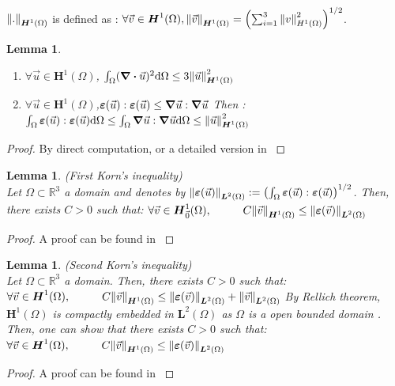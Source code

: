 \documentclass[a4paper,12pt,twoside]{report}
\newcommand{\mtr}{\mathbb{R}}
\newcommand{\dif}{\mathrm{d}}
\newtheorem{lemma}[theorem]{Lemma}
\begin{document}
$\norm{.}_{\boldsymbol H^1(\Omega)}$ is defined as : $\forall \vec v \in \boldsymbol H^1(\Omega), \norm{\vec v}_{\boldsymbol H^1(\Omega)} = \left(\sum_{i=1}^3 \norm{v}_{H^1(\Omega)}^2 \right)^{1/2}$. 
\begin{lemma}
\begin{enumerate}
    \item $\displaystyle \forall \vec u \in \boldsymbol H^1(\Omega)$, $\int_\Omega (\div \vec u)^2 \dif \Omega \leq 3 \norm{\vec u}_{\boldsymbol H^1(\Omega)}^2$
    \item $\displaystyle \forall \vec u \in \boldsymbol H^1(\Omega)$,$\boldsymbol \varepsilon(\vec u) : \boldsymbol \varepsilon(\vec u) \leq \grad \vec u : \grad \vec u$
    Then : $\int_\Omega \boldsymbol \varepsilon(\vec u) : \boldsymbol \varepsilon(\vec u) \dif\Omega \leq \int_\Omega \grad \vec u : \grad \vec u \dif \Omega \leq \norm{\vec u}_{\boldsymbol H^1(\Omega)}^2$
\end{enumerate}
\end{lemma}
\begin{proof}
    By direct computation, or a detailed version in \cite{cinatl_finite}
\end{proof}

\begin{lemma}
\label{Korn1}
    (First Korn's inequality) \\
    Let $\Omega \subset \mtr^3$ a domain and denotes by $\norm{\boldsymbol \varepsilon(\vec u)}_{\boldsymbol L^2(\Omega)} := \left(\int_\Omega \boldsymbol \varepsilon(\vec u):\boldsymbol \varepsilon(\vec u)\right)^{1/2}$. Then, there exists $C > 0$ such that: $\forall \vec v \in \boldsymbol H^1_{\vec 0}(\Omega), \hspace{1cm} C\norm{\vec v}_{\boldsymbol H^1(\Omega)} \leq \norm{\boldsymbol \varepsilon(\vec v)}_{\boldsymbol L^2(\Omega)}$
\end{lemma}
\begin{proof}
    A proof can be found in \cite{brenner_mathematical_2008}
\end{proof}

\begin{lemma}
\label{Korn2}
    (Second Korn's inequality) \\
    Let $\Omega \subset \mtr^3$ a domain. Then, there exists $C > 0$ such that: 
    $\forall \vec v \in \boldsymbol H^1(\Omega), \hspace{1cm} C\norm{\vec v}_{\boldsymbol H^1(\Omega)} \leq \norm{\boldsymbol \varepsilon(\vec v)}_{\boldsymbol L^2(\Omega)} + \norm{\vec v}_{\boldsymbol L^2(\Omega)}$
    By Rellich theorem, $\boldsymbol H^1(\Omega)$ is compactly embedded in $\boldsymbol L^2(\Omega)$ as $\Omega$ is a open bounded domain . Then, one can show that there exists $C > 0$ such that:
    $\forall \vec v \in \boldsymbol H^1(\Omega), \hspace{1cm} C\norm{\vec v}_{\boldsymbol H^1(\Omega)} \leq \norm{\boldsymbol \varepsilon(\vec v)}_{\boldsymbol L^2(\Omega)}$
\end{lemma}
\begin{proof}
    A proof can be found in \cite{brenner_mathematical_2008}
\end{proof}
\end{document}
